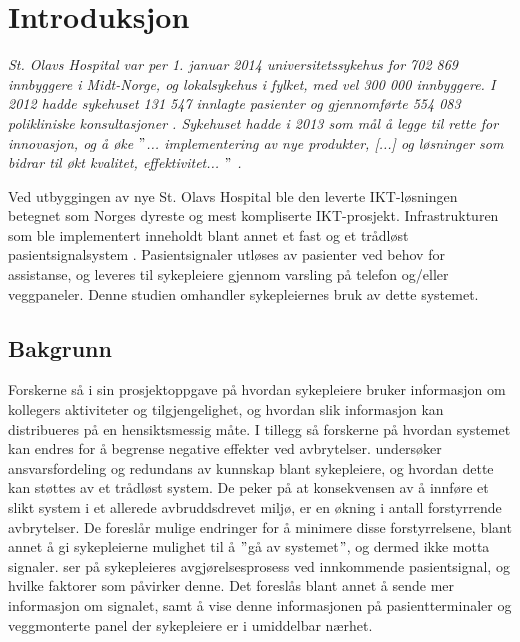 \chapter{Introduksjon}
\label{chp:introduksjon}

\textit{St. Olavs Hospital var per 1. januar 2014 universitetssykehus for 702 869 innbyggere i Midt-Norge, og lokalsykehus i fylket, med vel 300 000 innbyggere. I 2012 hadde sykehuset 131 547 innlagte pasienter og gjennomførte 554 083 polikliniske konsultasjoner \citep{stolavs}. Sykehuset hadde i 2013 som mål å legge til rette for innovasjon, og å øke $"$... implementering av nye produkter, [...] og løsninger som bidrar til økt kvalitet, effektivitet... $"$ \citep{styring13}.}

\noindent
Ved utbyggingen av nye St. Olavs Hospital ble den leverte IKT-løsningen betegnet som Norges dyreste og mest kompliserte IKT-prosjekt. Infrastrukturen som ble implementert inneholdt blant annet et fast og et trådløst pasientsignalsystem \citep{TU}. Pasientsignaler utløses av pasienter ved behov for assistanse, og leveres til sykepleiere gjennom varsling på telefon og/eller veggpaneler. Denne studien omhandler sykepleiernes bruk av dette systemet.  

\section{Bakgrunn}
Forskerne så i sin prosjektoppgave \citep{Sund13} på hvordan sykepleiere bruker informasjon om kollegers aktiviteter og tilgjengelighet, og hvordan slik informasjon kan distribueres på en hensiktsmessig måte. I tillegg så forskerne på hvordan systemet kan endres for å begrense negative effekter ved avbrytelser. \citet{KlemetsRedundancy} undersøker ansvarsfordeling og redundans av kunnskap blant sykepleiere, og hvordan dette kan støttes av et trådløst system. De peker på at konsekvensen av å innføre et slikt system i et allerede avbruddsdrevet miljø, er en økning i antall forstyrrende avbrytelser. De foreslår mulige endringer for å minimere disse forstyrrelsene, blant annet å gi sykepleierne mulighet til å $"$gå av systemet$"$, og dermed ikke motta signaler. \citet{klemets13} ser på sykepleieres avgjørelsesprosess ved innkommende pasientsignal, og hvilke faktorer som påvirker denne. Det foreslås blant annet å sende mer informasjon om signalet, samt å vise denne informasjonen på pasientterminaler og veggmonterte panel der sykepleiere er i umiddelbar nærhet.

